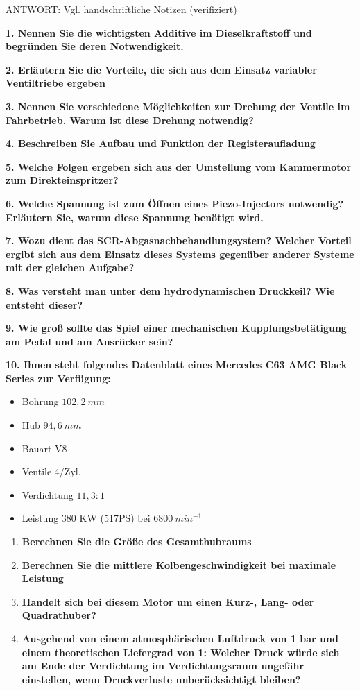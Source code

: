 ANTWORT: Vgl. handschriftliche Notizen (verifiziert)

\textbf{1. Nennen Sie die wichtigsten Additive im Dieselkraftstoff und
begründen Sie deren Notwendigkeit.}

\textbf{2. Erläutern Sie die Vorteile, die sich aus dem Einsatz
variabler Ventiltriebe ergeben}

\textbf{3. Nennen Sie verschiedene Möglichkeiten zur Drehung der Ventile
im Fahrbetrieb. Warum ist diese Drehung notwendig?}

\textbf{4. Beschreiben Sie Aufbau und Funktion der Registeraufladung}

\textbf{5. Welche Folgen ergeben sich aus der Umstellung vom Kammermotor
zum Direkteinspritzer?}

\textbf{6. Welche Spannung ist zum Öffnen eines Piezo-Injectors
notwendig? Erläutern Sie, warum diese Spannung benötigt wird.}

\textbf{7. Wozu dient das SCR-Abgasnachbehandlungsystem? Welcher Vorteil
ergibt sich aus dem Einsatz dieses Systems gegenüber anderer Systeme mit
der gleichen Aufgabe?}

\textbf{8. Was versteht man unter dem hydrodynamischen Druckkeil? Wie
entsteht dieser?}

\textbf{9. Wie groß sollte das Spiel einer mechanischen
Kupplungsbetätigung am Pedal und am Ausrücker sein?}

\textbf{10. Ihnen steht folgendes Datenblatt eines Mercedes C63 AMG
Black Series zur Verfügung:}

\begin{itemize}
\item
  Bohrung $102,2~mm$
\item
  Hub $94,6~mm$
\item
  Bauart V8
\item
  Ventile 4/Zyl.
\item
  Verdichtung $11,3 : 1$
\item
  Leistung 380 KW (517PS) bei $6800~min^{-1}$
\end{itemize}

\begin{enumerate}
\item
  \textbf{Berechnen Sie die Größe des Gesamthubraums}
\item
  \textbf{Berechnen Sie die mittlere Kolbengeschwindigkeit bei maximale
  Leistung}
\item
  \textbf{Handelt sich bei diesem Motor um einen Kurz-, Lang- oder
  Quadrathuber?}
\item
  \textbf{Ausgehend von einem atmosphärischen Luftdruck von 1 bar und
  einem theoretischen Liefergrad von 1: Welcher Druck würde sich am Ende
  der Verdichtung im Verdichtungsraum ungefähr einstellen, wenn
  Druckverluste unberücksichtigt bleiben?}
\end{enumerate}
